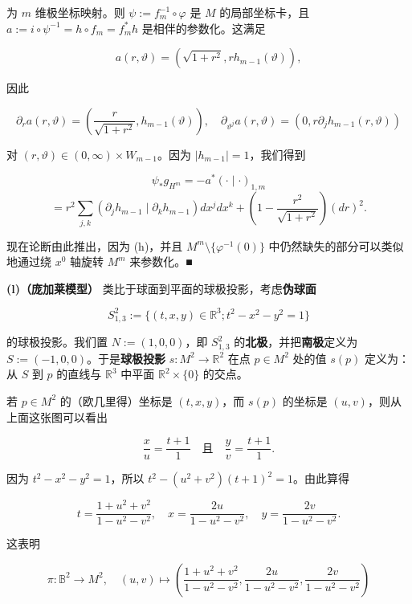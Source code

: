 \begin{example}
\begin{items}
为 $ m $ 维极坐标映射。则 $ \psi := f_m^{-1} \circ \varphi $ 是 $ M $ 的局部坐标卡，且 $ a := i \circ \psi^{-1} = h \circ f_m = f_m^* h $ 是相伴的参数化。这满足

\[
a(r, \vartheta) = (\sqrt{1+r^2}, r h_{m-1}(\vartheta)),
\]

因此

\[
\partial_r a(r, \vartheta) = \left( \frac{r}{\sqrt{1+r^2}}, h_{m-1}(\vartheta) \right), \quad \partial_{\vartheta^j} a(r, \vartheta) = (0, r\partial_j h_{m-1}(r, \vartheta))
\]

对 $ (r, \vartheta) \in (0, \infty) \times W_{m-1} $。因为 $ |h_{m-1}| = 1 $，我们得到

\[
\psi_* g_{H^m} = -a^*(\cdot\mid\cdot)_{1,m}
\]
\[
= r^2 \sum_{j,k} (\partial_j h_{m-1} \mid \partial_k h_{m-1}) dx^j dx^k + \left( 1 - \frac{r^2}{\sqrt{1+r^2}} \right)(dr)^2.
\]

现在论断由此推出，因为 (h)，并且 $ M^m \setminus \{\varphi^{-1}(0)\} $ 中仍然缺失的部分可以类似地通过绕 $ x^0 $ 轴旋转 $ M^m $ 来参数化。\nobreak\hspace{0.35em}■

\end{items}

\textbf{(l)（庞加莱模型）} 类比于球面到平面的球极投影，考虑\textbf{伪球面}

\[
S^2_{1,3} := \{ (t, x, y) \in \mathbb{R}^3 ; t^2 - x^2 - y^2 = 1 \}
\]

的球极投影。我们置 $ N := (1, 0, 0) $，即 $ S^2_{1,3} $ 的\textbf{北极}，并把\textbf{南极}定义为 $ S := (-1, 0, 0) $。于是\textbf{球极投影} $ s : M^2 \to \mathbb{R}^2 $ 在点 $ p \in M^2 $ 处的值 $ s(p) $ 定义为：从 $ S $ 到 $ p $ 的直线与 $ \mathbb{R}^3 $ 中平面 $ \mathbb{R}^2 \times \{0\} $ 的交点。


若 $ p \in M^2 $ 的（欧几里得）坐标是 $ (t, x, y) $，而 $ s(p) $ 的坐标是 $ (u, v) $，则从上面这张图可以看出

\[
\frac{x}{u} = \frac{t+1}{1} \quad \text{且} \quad \frac{y}{v} = \frac{t+1}{1}.
\]

因为 $ t^2 - x^2 - y^2 = 1 $，所以 $ t^2 - (u^2+v^2)(t+1)^2 = 1 $。由此算得

\[
t = \frac{1+u^2+v^2}{1-u^2-v^2}, \quad x = \frac{2u}{1-u^2-v^2}, \quad y = \frac{2v}{1-u^2-v^2}.
\]

这表明

\[
\pi : \mathbb{B}^2 \to M^2, \quad (u, v) \mapsto \left( \frac{1+u^2+v^2}{1-u^2-v^2}, \frac{2u}{1-u^2-v^2}, \frac{2v}{1-u^2-v^2} \right)
\]


\end{example}
